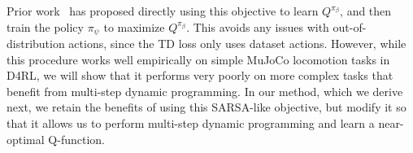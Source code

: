 Prior work~\citep{brandfonbrener2021offline, gulcehre2021regularized, peng2019advantage}
has proposed directly using this objective to learn $Q^{\pi_\beta}$, and then train the policy $\pi_\psi$ to maximize $Q^{\pi_\beta}$. This avoids any issues with out-of-distribution actions, since the TD loss only uses dataset actions. However, while this procedure works well empirically on simple MuJoCo locomotion tasks in D4RL, we will show that it performs very poorly on more complex tasks that benefit from multi-step dynamic programming. In our method, which we derive next, we retain the benefits of using this SARSA-like objective, but modify it so that it allows us to perform multi-step dynamic programming and learn a near-optimal Q-function.

